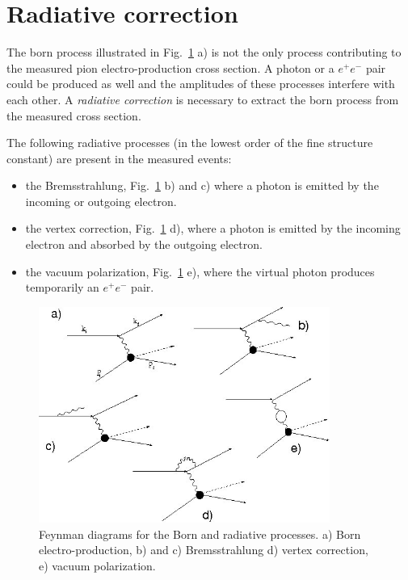 \section{Radiative correction}
The born process illustrated in Fig.~\ref{fig:rad} a) is not the only process
contributing to the measured pion electro-production cross section.
A photon or a $e^+e^- $ pair could be produced as well and the amplitudes
of these processes interfere with each other.
A {\em radiative correction} is necessary to extract the born process from the
measured cross section.

The  following radiative processes (in the lowest order of the
fine structure constant) are present in the measured events:
\begin{itemize}
\item the Bremsstrahlung, Fig.~\ref{fig:rad} b) and c) where a photon is emitted by
      the incoming or outgoing electron.
\item the vertex correction, Fig.~\ref{fig:rad} d), where a photon is emitted by the
      incoming electron and absorbed by the outgoing electron.
\item the vacuum polarization, Fig.~\ref{fig:rad} e), where the virtual photon
      produces temporarily an $e^+e^-$ pair.
\end{itemize}

\vspace{1cm}
\begin{figure}[h]
  \centering
                \includegraphics[width=0.85\textwidth ]{img/rad.jpg}
                \caption{ Feynman diagrams for the Born and radiative processes.
	             a) Born electro-production, b) and c) Bremsstrahlung d) vertex
		         correction, e) vacuum polarization.}
                \label{fig:rad}
\end{figure}


